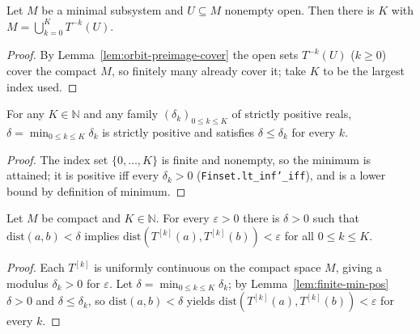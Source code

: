 \begin{lemma}
    \label{lem:cover-by-preimages}
    \leanok
    Let $M$ be a minimal subsystem and $U \subseteq M$ nonempty open. Then there
    is $K$ with $M = \bigcup_{k=0}^{K} T^{-k}(U)$.
\end{lemma}
\begin{proof}
    By Lemma~\ref{lem:orbit-preimage-cover} the open sets $T^{-k}(U)$
    ($k \ge 0$) cover the compact $M$, so finitely many already cover it; take
    $K$ to be the largest index used.
\end{proof}

\begin{lemma}
    \label{lem:finite-min-pos}
    \leanok
    For any $K \in \mathbb{N}$ and any family $(\delta_k)_{0 \le k \le K}$ of
    strictly positive reals, $\delta = \min_{0 \le k \le K} \delta_k$ is strictly
    positive and satisfies $\delta \le \delta_k$ for every $k$.
\end{lemma}
\begin{proof}
    The index set $\{0, \dots, K\}$ is finite and nonempty, so the minimum is
    attained; it is positive iff every $\delta_k > 0$
    (\texttt{Finset.lt\_inf'\_iff}), and is a lower bound by definition of
    minimum.
\end{proof}

\begin{lemma}
    \label{lem:uniform-modulus}
    \leanok
    Let $M$ be compact and $K \in \mathbb{N}$. For every $\varepsilon > 0$ there
    is $\delta > 0$ such that $\mathrm{dist}(a,b) < \delta$ implies
    $\mathrm{dist}(T^{[k]}(a), T^{[k]}(b)) < \varepsilon$ for all
    $0 \le k \le K$.
\end{lemma}
\begin{proof}
    Each $T^{[k]}$ is uniformly continuous on the compact space $M$, giving a
    modulus $\delta_k > 0$ for $\varepsilon$. Let
    $\delta = \min_{0 \le k \le K} \delta_k$; by Lemma~\ref{lem:finite-min-pos}
    $\delta > 0$ and $\delta \le \delta_k$, so $\mathrm{dist}(a,b) < \delta$
    yields $\mathrm{dist}(T^{[k]}(a), T^{[k]}(b)) < \varepsilon$ for every $k$.
\end{proof}

